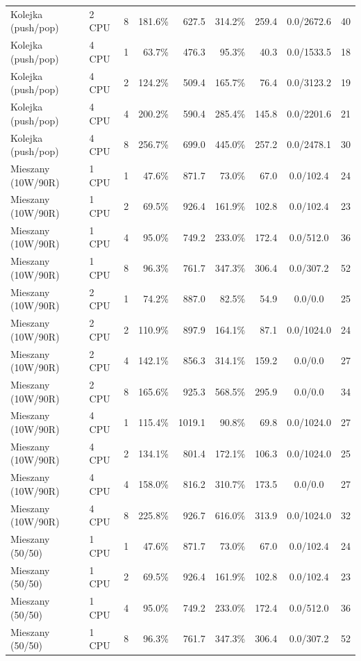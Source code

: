 \begin{table}[ht]
{\begin{tabular}{llcrrrrcc}
Kolejka (push/pop) & 2 CPU & 8 & 181.6\% & 627.5 & 314.2\% & 259.4 & 0.0/2672.6 & 40 \\
Kolejka (push/pop) & 4 CPU & 1 & 63.7\% & 476.3 & 95.3\% & 40.3 & 0.0/1533.5 & 18 \\
Kolejka (push/pop) & 4 CPU & 2 & 124.2\% & 509.4 & 165.7\% & 76.4 & 0.0/3123.2 & 19 \\
Kolejka (push/pop) & 4 CPU & 4 & 200.2\% & 590.4 & 285.4\% & 145.8 & 0.0/2201.6 & 21 \\
Kolejka (push/pop) & 4 CPU & 8 & 256.7\% & 699.0 & 445.0\% & 257.2 & 0.0/2478.1 & 30 \\
Mieszany (10W/90R) & 1 CPU & 1 & 47.6\% & 871.7 & 73.0\% & 67.0 & 0.0/102.4 & 24 \\
Mieszany (10W/90R) & 1 CPU & 2 & 69.5\% & 926.4 & 161.9\% & 102.8 & 0.0/102.4 & 23 \\
Mieszany (10W/90R) & 1 CPU & 4 & 95.0\% & 749.2 & 233.0\% & 172.4 & 0.0/512.0 & 36 \\
Mieszany (10W/90R) & 1 CPU & 8 & 96.3\% & 761.7 & 347.3\% & 306.4 & 0.0/307.2 & 52 \\
Mieszany (10W/90R) & 2 CPU & 1 & 74.2\% & 887.0 & 82.5\% & 54.9 & 0.0/0.0 & 25 \\
Mieszany (10W/90R) & 2 CPU & 2 & 110.9\% & 897.9 & 164.1\% & 87.1 & 0.0/1024.0 & 24 \\
Mieszany (10W/90R) & 2 CPU & 4 & 142.1\% & 856.3 & 314.1\% & 159.2 & 0.0/0.0 & 27 \\
Mieszany (10W/90R) & 2 CPU & 8 & 165.6\% & 925.3 & 568.5\% & 295.9 & 0.0/0.0 & 34 \\
Mieszany (10W/90R) & 4 CPU & 1 & 115.4\% & 1019.1 & 90.8\% & 69.8 & 0.0/1024.0 & 27 \\
Mieszany (10W/90R) & 4 CPU & 2 & 134.1\% & 801.4 & 172.1\% & 106.3 & 0.0/1024.0 & 25 \\
Mieszany (10W/90R) & 4 CPU & 4 & 158.0\% & 816.2 & 310.7\% & 173.5 & 0.0/0.0 & 27 \\
Mieszany (10W/90R) & 4 CPU & 8 & 225.8\% & 926.7 & 616.0\% & 313.9 & 0.0/1024.0 & 32 \\
Mieszany (50/50) & 1 CPU & 1 & 47.6\% & 871.7 & 73.0\% & 67.0 & 0.0/102.4 & 24 \\
Mieszany (50/50) & 1 CPU & 2 & 69.5\% & 926.4 & 161.9\% & 102.8 & 0.0/102.4 & 23 \\
Mieszany (50/50) & 1 CPU & 4 & 95.0\% & 749.2 & 233.0\% & 172.4 & 0.0/512.0 & 36 \\
Mieszany (50/50) & 1 CPU & 8 & 96.3\% & 761.7 & 347.3\% & 306.4 & 0.0/307.2 & 52 \\

\end{tabular}}
\end{table}
